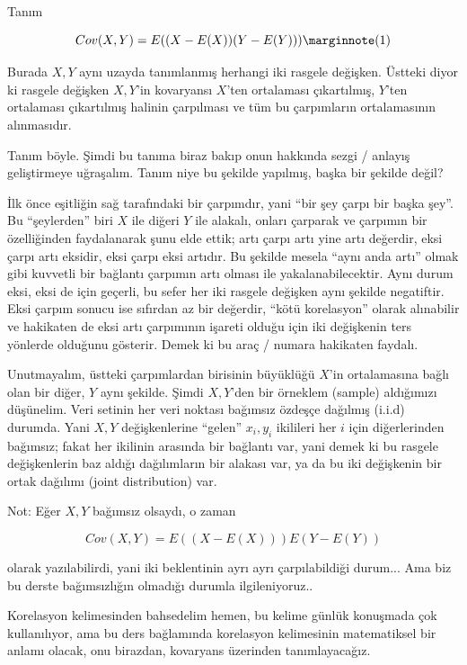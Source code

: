 \documentclass[12pt,fleqn]{article}\usepackage{../../common}
\begin{document}
Tanım

$$ 
Cov(X,Y) = E((X-E(X))(Y-E(Y))) 
\mlabel{1} 
$$

Burada $X,Y$ aynı uzayda tanımlanmış herhangi iki rasgele değişken. Üstteki
diyor ki rasgele değişken $X,Y$'in kovaryansı $X$'ten ortalaması
çıkartılmış, $Y$'ten ortalaması çıkartılmış halinin çarpılması ve tüm bu
çarpımların ortalamasının alınmasıdır.

Tanım böyle. Şimdi bu tanıma biraz bakıp onun hakkında sezgi / anlayış
geliştirmeye uğraşalım. Tanım niye bu şekilde yapılmış, başka bir şekilde
değil?

İlk önce eşitliğin sağ tarafındaki bir çarpımdır, yani ``bir şey çarpı bir
başka şey''. Bu ``şeylerden'' biri $X$ ile diğeri $Y$ ile alakalı, onları
çarparak ve çarpımın bir özelliğinden faydalanarak şunu elde ettik; artı
çarpı artı yine artı değerdir, eksi çarpı artı eksidir, eksi çarpı eksi
artıdır. Bu şekilde mesela ``aynı anda artı'' olmak gibi kuvvetli bir
bağlantı çarpımın artı olması ile yakalanabilecektir. Aynı durum eksi, eksi
de için geçerli, bu sefer her iki rasgele değişken aynı şekilde
negatiftir. Eksi çarpım sonucu ise sıfırdan az bir değerdir, ``kötü
korelasyon'' olarak alınabilir ve hakikaten de eksi artı çarpımının işareti
olduğu için iki değişkenin ters yönlerde olduğunu gösterir. Demek ki bu
araç / numara hakikaten faydalı.

Unutmayalım, üstteki çarpımlardan birisinin büyüklüğü $X$'in ortalamasına
bağlı olan bir diğer, $Y$ aynı şekilde. Şimdi $X,Y$'den bir örneklem
(sample) aldığımızı düşünelim. Veri setinin her veri noktası bağımsız
özdeşçe dağılmış (i.i.d) durumda. Yani $X,Y$ değişkenlerine ``gelen''
$x_i,y_i$ ikilileri her $i$ için diğerlerinden bağımsız; fakat her ikilinin
arasında bir bağlantı var, yani demek ki bu rasgele değişkenlerin baz
aldığı dağılımların bir alakası var, ya da bu iki değişkenin bir ortak
dağılımı (joint distribution) var.

Not: Eğer $X,Y$ bağımsız olsaydı, o zaman 

$$ Cov(X,Y) = E((X-E(X))) E(Y-E(Y))  $$

olarak yazılabilirdi, yani iki beklentinin ayrı ayrı çarpılabildiği
durum... Ama biz bu derste bağımsızlığın olmadığı durumla ilgileniyoruz..

Korelasyon kelimesinden bahsedelim hemen, bu kelime günlük konuşmada çok
kullanılıyor, ama bu ders bağlamında korelasyon kelimesinin matematiksel
bir anlamı olacak, onu birazdan, kovaryans üzerinden tanımlayacağız.
\end{document}
